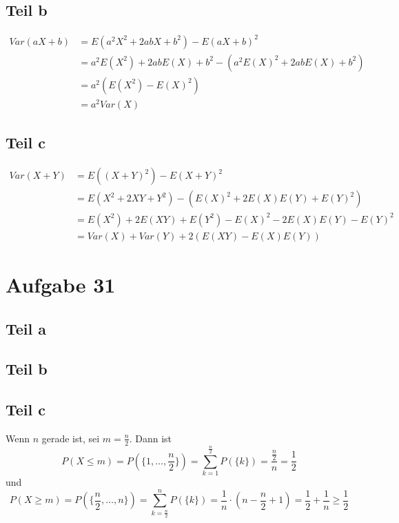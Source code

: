 \documentclass[10pt,a4paper]{article}
\begin{document}
\subsection{Teil b}
\begin{align*}
  Var(aX + b) & = E(a^{2}X^{2} + 2abX + b^{2}) - E(aX + b)^{2}\\
  & = a^{2} E(X^{2}) + 2abE(X) + b^{2} - \left( a^{2}E(X)^{2} + 2abE(X) + b^{2} \right)\\
  & = a^{2} (E(X^{2}) - E(X)^{2})\\
  & = a^{2} Var(X)
\end{align*}

\subsection{Teil c}
\begin{align*}
  Var(X + Y) & = E((X + Y)^{2}) - E(X + Y)^{2}\\
  & = E(X^{2} + 2XY + Y^{2}) - \left( E(X)^{2} + 2E(X)E(Y) + E(Y)^{2} \right)\\
  & = E(X^{2}) + 2E(XY) + E(Y^{2}) - E(X)^{2} - 2E(X)E(Y) - E(Y)^{2}\\
  & = Var(X) + Var(Y) + 2 \left( E(XY) - E(X)E(Y) \right)
\end{align*}

\section{Aufgabe 31}

\subsection{Teil a}

\subsection{Teil b}

\subsection{Teil c}
Wenn $n$ gerade ist, sei $m = \frac{n}{2}$.
Dann ist
\begin{equation}
  P(X \le m) = P(\{ 1, \dots, \frac{n}{2} \}) = \sum_{k = 1}^{\frac{n}{2}} P(\{k\}) = \frac{\frac{n}{2}}{n} = \frac{1}{2}
\end{equation}
und
\begin{equation}
  P(X \ge m) = P(\{ \frac{n}{2}, \dots, n \}) = \sum_{k = \frac{n}{2}}^{n} P(\{k\}) = \frac{1}{n} \cdot (n - \frac{n}{2} + 1) = \frac{1}{2} + \frac{1}{n} \ge \frac{1}{2}
\end{equation}
\end{document}
